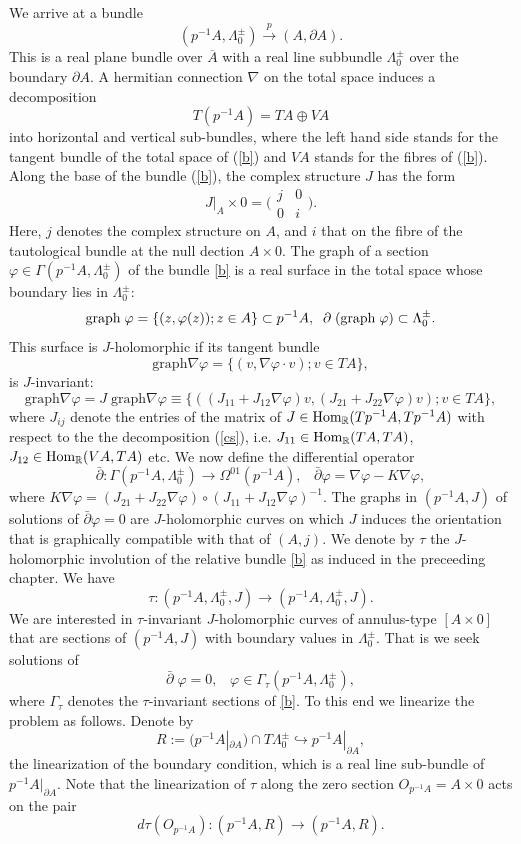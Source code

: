 \documentclass{amsart}
\newcommand{\be}{\begin{equation}}
\newcommand{\ee}{\end{equation}}
\begin{document}
 We arrive at a bundle
\be \label{b}
(p^{-1} A , \Lambda_0^\pm) \stackrel{p}\longrightarrow (A, \partial A).
\ee
This is a real plane bundle over $\overline{A}$ with a real line subbundle $\Lambda_0^\pm$ over the boundary $\partial A$.
A hermitian connection $\nabla$ on the total space induces a decomposition 
\be \label{cs}
 T (p^{-1} A) =TA \oplus VA
\ee   
into horizontal and vertical sub-bundles, where the left hand side stands for the tangent bundle of the total space of (\ref{b}) and $VA$ stands for the fibres of (\ref{b}). Along the base of the bundle (\ref{b}), the complex structure $J$ has the form 
\be \label{J0}
 J|_A \times  0=\bigg(\begin{array}{cc} j & 0\\ 0 &
i\end{array}\bigg).
\ee
Here, $j$ denotes the complex structure on $A$, and $i$ that on the fibre of the tautological bundle at the null dection $A \times  0$. The graph of a section $\varphi\in\Gamma(p^{-1}A,\Lambda_0^\pm)$  of the bundle \eqref{b} is a real surface in the total space whose boundary lies in  $\Lambda_0^\pm$:
\be
{\rm graph} \;\varphi=\{(z,\varphi(z));z \in A\} \subset p^{-1}A,\;\;
\partial\;({\rm graph}\;\varphi) \subset \Lambda_0^\pm. 
\ee
This surface is $J$-holomorphic if its tangent bundle
\[
\mbox{graph}\nabla\varphi= \{(v,\nabla\varphi\cdot v); v\in TA\},
\] 
is $J$-invariant:
\[
\mbox{graph}\nabla\varphi=J\;\mbox{graph}\nabla\varphi
\equiv \{ ((J_{11} + J_{12}\nabla \varphi)v, 
(J_{21} + J_{22}\nabla \varphi)v) ; v\in TA \},
\]
where $J_{ij}$ denote the entries of the matrix of $J \in {\rm Hom}_{\mathbb{R}}(Tp^{-1}A,Tp^{-1}A  )$ with respect to the the decomposition (\ref{cs}), i.e. $J_{11}\in {\rm Hom}_{\mathbb{R}}(TA, TA)$, $J_{12}\in {\rm Hom}_{\mathbb{R}}(VA, TA)$ etc. We now define the differential operator
\be \label{cr}
\bar{\partial}:\Gamma(p^{-1}A, \Lambda_0^{\pm} )\to\Omega^{01}(p^{-1}A),
\;\;\;\bar{\partial}\varphi=\nabla\varphi- K\nabla \varphi  ,
\ee
where  $K\nabla \varphi=(J_{21} + J_{22}\nabla \varphi)\circ (J_{11} + J_{12}\nabla \varphi)^{-1}$. The graphs in $(p^{-1}A,J) $ of solutions of $\bar{\partial} \varphi=0$ are $J$-holomorphic curves on which $J$ induces the orientation that is graphically compatible with that of $(A,j)$. We denote by $\tau$ the $J$-holomorphic involution of the relative bundle \eqref{b} as induced in the preceeding chapter. We have
\[ \tau : (p^{-1}A,\Lambda_0^{\pm}, J) \to (p^{-1}A,\Lambda_0^{\pm}, J).
\]
We are interested in $\tau$-invariant $J$-holomorphic curves of annulus-type $[A \times 0]$ that are sections of $(p^{-1}A,J)$ with boundary values in $\Lambda_0^{\pm}$. That is we seek solutions of
\be \label{cr0}
\bar{\partial}\;\varphi=0,  \;\;\;
\varphi \in \Gamma_\tau(p^{-1}A, \Lambda_0^{\pm}),
\ee
where $\Gamma_\tau$ denotes the $\tau$-invariant sections of \eqref{b}. To this end we linearize the problem as follows. Denote by 
\[
R:= (p^{-1}A|_{\partial A})\cap T\Lambda_0^{\pm}\hookrightarrow p^{-1}A|_{\partial A},
\]
the linearization of the boundary condition, which is a real line sub-bundle of $p^{-1}A|_{\partial A}$. Note that the linearization of $\tau$ along the zero section 
$ O_{p^{-1}A} = A \times 0$ acts on the pair 
\be\label{bdry}
d\tau(O_{p^{-1}A}): (p^{-1}A,R) \to (p^{-1}A,R).
\ee 
\end{document}
